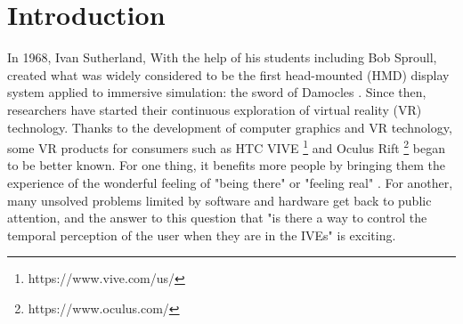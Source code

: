 \documentclass[sigconf]{acmart}
\begin{document}



\maketitle

\section{Introduction}


In 1968, Ivan Sutherland, With the help of his students including Bob Sproull, created what was widely considered to be the first head-mounted (HMD) display system applied to immersive simulation: the sword of Damocles \cite{sutherland1968head}. Since then, researchers have started their continuous exploration of virtual reality (VR) technology. Thanks to the development of computer graphics and VR technology, some VR products for consumers such as HTC VIVE \footnote[1]{https://www.vive.com/us/}  and Oculus Rift \footnote[2]{https://www.oculus.com/} began to be better known. For one thing, it benefits more people by bringing them the experience of the wonderful feeling of "being there" \cite{held1992telepresence,sheridan1992musings,barfield1993sense,slater1997framework,draper1998telepresence,bystrom1999conceptual,sanchez2005presence} or "feeling real" \cite{parola2016turning}. For another, many unsolved problems limited by software and hardware get back to public attention, and the answer to this question that "is there a way to control the temporal perception of the user when they are in the IVEs" is exciting.
\end{document}
